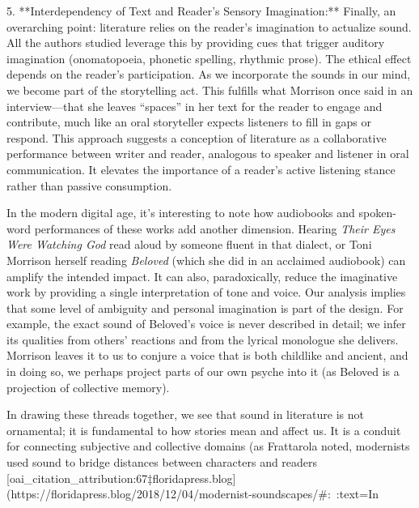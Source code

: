 \documentclass[12pt]{report}
\begin{document}
5. **Interdependency of Text and Reader’s Sensory Imagination:** Finally, an overarching point: literature relies on the reader’s imagination to actualize sound. All the authors studied leverage this by providing cues that trigger auditory imagination (onomatopoeia, phonetic spelling, rhythmic prose). The ethical effect depends on the reader’s participation. As we incorporate the sounds in our mind, we become part of the storytelling act. This fulfills what Morrison once said in an interview—that she leaves “spaces” in her text for the reader to engage and contribute, much like an oral storyteller expects listeners to fill in gaps or respond. This approach suggests a conception of literature as a collaborative performance between writer and reader, analogous to speaker and listener in oral communication. It elevates the importance of a reader’s active listening stance rather than passive consumption.

   In the modern digital age, it’s interesting to note how audiobooks and spoken-word performances of these works add another dimension. Hearing \textit{Their Eyes Were Watching God} read aloud by someone fluent in that dialect, or Toni Morrison herself reading \textit{Beloved} (which she did in an acclaimed audiobook) can amplify the intended impact. It can also, paradoxically, reduce the imaginative work by providing a single interpretation of tone and voice. Our analysis implies that some level of ambiguity and personal imagination is part of the design. For example, the exact sound of Beloved’s voice is never described in detail; we infer its qualities from others’ reactions and from the lyrical monologue she delivers. Morrison leaves it to us to conjure a voice that is both childlike and ancient, and in doing so, we perhaps project parts of our own psyche into it (as Beloved is a projection of collective memory). 

In drawing these threads together, we see that sound in literature is not ornamental; it is fundamental to how stories mean and affect us. It is a conduit for connecting subjective and collective domains (as Frattarola noted, modernists used sound to bridge distances between characters and readers [oai_citation_attribution:67‡floridapress.blog](https://floridapress.blog/2018/12/04/modernist-soundscapes/#:~:text=In%
\end{document}
